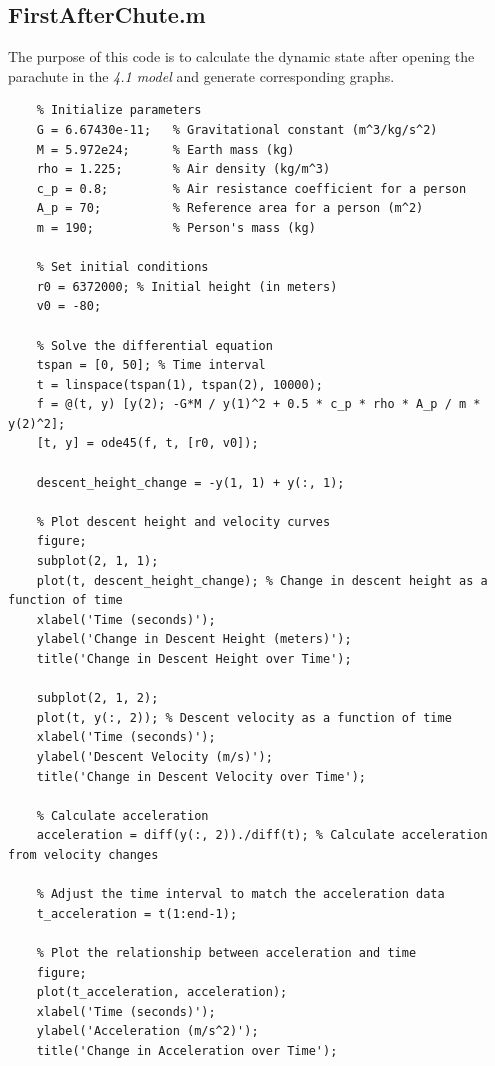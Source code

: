 \documentclass[12pt]{article}
\begin{document}
\subsection{FirstAfterChute.m}
The purpose of this code is to calculate the dynamic state after opening the parachute 
in the \textit{4.1 model} and generate corresponding graphs.
\begin{lstlisting}
    % Initialize parameters
    G = 6.67430e-11;   % Gravitational constant (m^3/kg/s^2)
    M = 5.972e24;      % Earth mass (kg)
    rho = 1.225;       % Air density (kg/m^3)
    c_p = 0.8;         % Air resistance coefficient for a person
    A_p = 70;          % Reference area for a person (m^2)
    m = 190;           % Person's mass (kg)

    % Set initial conditions
    r0 = 6372000; % Initial height (in meters)
    v0 = -80;    

    % Solve the differential equation
    tspan = [0, 50]; % Time interval
    t = linspace(tspan(1), tspan(2), 10000);
    f = @(t, y) [y(2); -G*M / y(1)^2 + 0.5 * c_p * rho * A_p / m * y(2)^2];
    [t, y] = ode45(f, t, [r0, v0]);

    descent_height_change = -y(1, 1) + y(:, 1);

    % Plot descent height and velocity curves
    figure;
    subplot(2, 1, 1);
    plot(t, descent_height_change); % Change in descent height as a function of time
    xlabel('Time (seconds)');
    ylabel('Change in Descent Height (meters)');
    title('Change in Descent Height over Time');

    subplot(2, 1, 2);
    plot(t, y(:, 2)); % Descent velocity as a function of time
    xlabel('Time (seconds)');
    ylabel('Descent Velocity (m/s)');
    title('Change in Descent Velocity over Time');

    % Calculate acceleration
    acceleration = diff(y(:, 2))./diff(t); % Calculate acceleration from velocity changes

    % Adjust the time interval to match the acceleration data
    t_acceleration = t(1:end-1);

    % Plot the relationship between acceleration and time
    figure;
    plot(t_acceleration, acceleration);
    xlabel('Time (seconds)');
    ylabel('Acceleration (m/s^2)');
    title('Change in Acceleration over Time');
\end{lstlisting}
\end{document}
